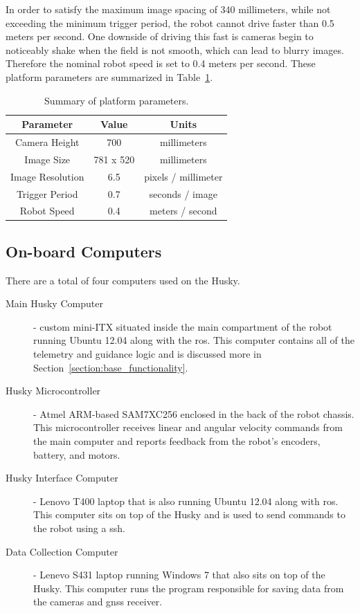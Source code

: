 In order to satisfy the maximum image spacing of 340 millimeters, while not exceeding the minimum trigger period, the robot cannot drive faster than 0.5 meters per second.  One downside of driving this fast is cameras begin to noticeably shake when the field is not smooth, which can lead to blurry images.  Therefore the nominal robot speed is set to 0.4 meters per second.  These platform parameters are summarized in Table~\ref{table:platform_params}.

\begin{table}
    \begin{center}
    \caption{Summary of platform parameters.}
    \begin{tabular}[c]{|c|c|c|}
        \hline
        Parameter & Value & Units \\
        \hline
        Camera Height    & 700       & millimeters         \\
        Image Size       & 781 x 520 & millimeters         \\
        Image Resolution & 6.5       & pixels / millimeter \\
        Trigger Period   & 0.7       & seconds / image     \\
        Robot Speed      & 0.4       & meters / second     \\
        \hline
    \end{tabular}
    \label{table:platform_params}
   \end{center}
\end{table}

\subsection{On-board Computers}

There are a total of four computers used on the Husky.

\begin{description}
\item[Main Husky Computer] - custom mini-ITX situated inside the main compartment of the robot running Ubuntu 12.04 along with the \ac{ros}. This computer contains all of the telemetry and guidance logic and is discussed more in Section~\ref{section:base_functionality}.  
\item[Husky Microcontroller] - Atmel ARM-based SAM7XC256 enclosed in the back of the robot chassis.  This microcontroller receives linear and angular velocity commands from the main computer and reports feedback from the robot's encoders, battery, and motors. 
\item[Husky Interface Computer] - Lenovo T400 laptop that is also running Ubuntu 12.04 along with \ac{ros}.  This computer sits on top of the Husky and is used to send commands to the robot using a \ac{ssh}.
\item[Data Collection Computer] - Lenevo S431 laptop running Windows 7 that also sits on top of the Husky.  This computer runs the program responsible for saving data from the cameras and \ac{gnss} receiver.   
\end{description}

